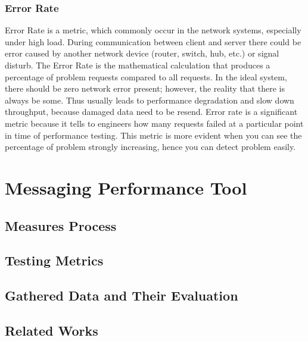 \subsection{Error Rate}
Error Rate is a metric, which commonly occur in the network systems, especially under high load. During communication between client and server there could be error caused by another network device (router, switch, hub, etc.) or signal disturb. The Error Rate is the mathematical calculation that produces a percentage of problem requests compared to all requests. In the ideal system, there should be zero network error present; however, the reality that there is always be some. Thus usually leads to performance degradation and slow down throughput, because damaged data need to be resend.
Error rate is a significant metric because it tells to engineers how many requests failed at a particular point in time of performance testing. This metric is more evident when you can see the percentage of problem strongly increasing, hence you can detect problem easily.

\chapter{Messaging Performance Tool}
\label{Messaging Performance Tool}

\section{Measures Process}
\label{Measures Process}

\section{Testing Metrics}
\label{Testing Metrics}

\section{Gathered Data and Their Evaluation}
\label{Gathered Data and Their Evaluation}

\section{Related Works}
\label{Related Works}

